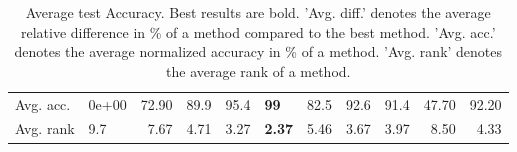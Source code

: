 \begin{table}[ht!]
\begin{tabular}{llrllllllrr}
  Avg. acc. & 0e+00 & 72.90 & 89.9 & 95.4 & \textbf{99} & 82.5 & 92.6 & 91.4 & 47.70 & 92.20 \\ 
  Avg. rank & 9.7 & 7.67 & 4.71 & 3.27 & \textbf{2.37} & 5.46 & 3.67 & 3.97 & 8.50 & 4.33 \\ 
   \hline
\hline
\end{tabular}
\endgroup
\caption{Average test Accuracy. 
                  Best results are bold. 
                  'Avg. diff.' denotes the average relative difference in \% of a method compared to the best method.
                  'Avg. acc.' denotes the average normalized accuracy in \% of a method.
                  'Avg. rank' denotes the average rank of a method.} 
\label{TABLES/table_results_Accuracy_clustering}
\end{table}
